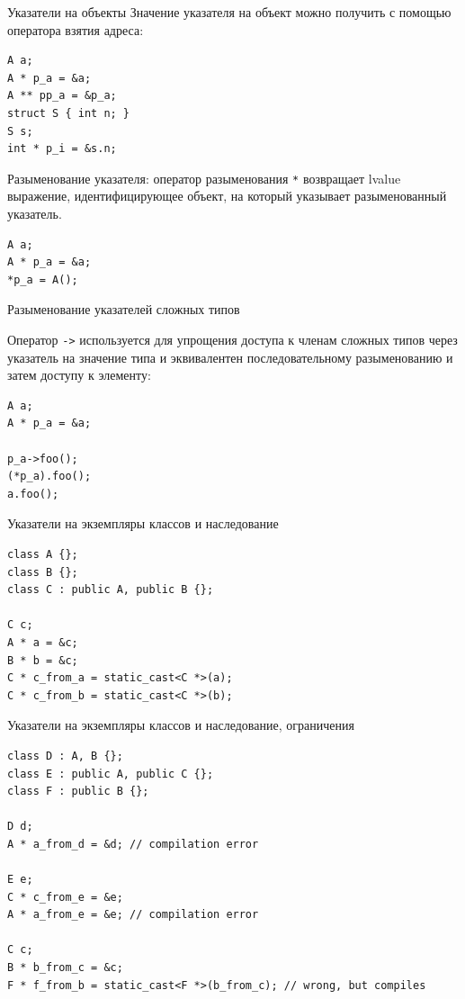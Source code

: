 \documentclass[unknownkeysallowed,xcolor=table]{beamer}
\begin{document}
\begin{frame}[fragile]{Указатели на объекты}
Значение указателя на объект можно получить с помощью оператора взятия адреса:

\begin{lstlisting}
A a;
A * p_a = &a;
A ** pp_a = &p_a;
struct S { int n; }
S s;
int * p_i = &s.n;
\end{lstlisting}

Разыменование указателя: оператор разыменования \lstinline{*} возвращает lvalue выражение, идентифицирующее объект, на который указывает разыменованный указатель.

\begin{lstlisting}
A a;
A * p_a = &a;
*p_a = A();
\end{lstlisting}

\end{frame}

\begin{frame}[fragile]{Разыменование указателей сложных типов}

Оператор \lstinline{->} используется для упрощения доступа к членам сложных типов через указатель на значение типа и эквивалентен последовательному разыменованию и затем доступу к элементу:

\vspace{1em}

\begin{lstlisting}
A a;
A * p_a = &a;

p_a->foo();
(*p_a).foo();
a.foo();
\end{lstlisting}

\end{frame}

\begin{frame}[fragile]{Указатели на экземпляры классов и наследование}

\begin{lstlisting}
class A {};
class B {};
class C : public A, public B {};

C c;
A * a = &c;
B * b = &c;
C * c_from_a = static_cast<C *>(a);
C * c_from_b = static_cast<C *>(b);
\end{lstlisting}

\end{frame}

\begin{frame}[fragile]{Указатели на экземпляры классов и наследование, ограничения}

\begin{lstlisting}
class D : A, B {};
class E : public A, public C {};
class F : public B {};

D d;
A * a_from_d = &d; // compilation error

E e;
C * c_from_e = &e;
A * a_from_e = &e; // compilation error

C c;
B * b_from_c = &c;
F * f_from_b = static_cast<F *>(b_from_c); // wrong, but compiles
\end{lstlisting}

\end{frame}
\end{document}
